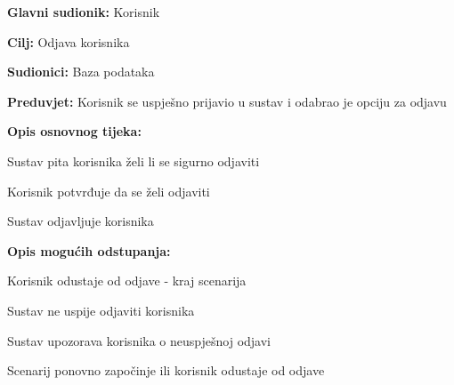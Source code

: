 					\noindent {}
					\begin{packed_item}
	
						\item \textbf{Glavni sudionik: }Korisnik
						\item  \textbf{Cilj:} Odjava korisnika
						\item  \textbf{Sudionici:} Baza podataka
						\item  \textbf{Preduvjet:} Korisnik se uspješno prijavio u sustav i odabrao je opciju za odjavu
						\item  \textbf{Opis osnovnog tijeka:}
						
						\item[] \begin{packed_enum}
							\item Sustav pita korisnika želi li se sigurno odjaviti
							\item Korisnik potvrđuje da se želi odjaviti
							\item Sustav odjavljuje korisnika
						\end{packed_enum}
						\item  \textbf{Opis mogućih odstupanja:}

						\item[] \begin{packed_item}
							\item[2.a] Korisnik odustaje od odjave - kraj scenarija
							\item[3.a] Sustav ne uspije odjaviti korisnika
							\item[] \begin{packed_enum}
								\item Sustav upozorava korisnika o neuspješnoj odjavi 
								\item Scenarij ponovno započinje ili korisnik odustaje od odjave
							\end{packed_enum}						
						\end{packed_item}
					\end{packed_item}


